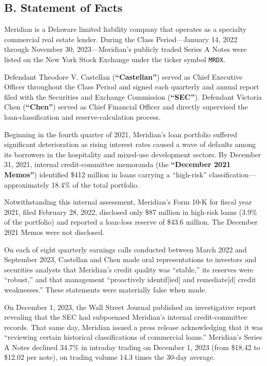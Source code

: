 \documentclass[12pt,letterpaper]{article}
\newcommand{\dterm}[1]{\textbf{``#1''}}
\begin{document}
\subsection*{B. Statement of Facts}

\begin{factlist}

\item Meridian is a Delaware limited liability company that operates as a specialty commercial real estate lender. During the Class Period---January 14, 2022 through November 30, 2023---Meridian's publicly traded Series A Notes were listed on the New York Stock Exchange under the ticker symbol \texttt{MRDX}.

\item Defendant Theodore V. Castellan (\dterm{Castellan}) served as Chief Executive Officer throughout the Class Period and signed each quarterly and annual report filed with the Securities and Exchange Commission (\dterm{SEC}). Defendant Victoria Chen (\dterm{Chen}) served as Chief Financial Officer and directly supervised the loan-classification and reserve-calculation process.

\item Beginning in the fourth quarter of 2021, Meridian's loan portfolio suffered significant deterioration as rising interest rates caused a wave of defaults among its borrowers in the hospitality and mixed-use development sectors. By December 31, 2021, internal credit-committee memoranda (the \dterm{December 2021 Memos}) identified \$412 million in loans carrying a ``high-risk'' classification---approximately 18.4\% of the total portfolio.

\item Notwithstanding this internal assessment, Meridian's Form 10-K for fiscal year 2021, filed February 28, 2022, disclosed only \$87 million in high-risk loans (3.9\% of the portfolio) and reported a loan-loss reserve of \$43.6 million. The December 2021 Memos were not disclosed.

\item On each of eight quarterly earnings calls conducted between March 2022 and September 2023, Castellan and Chen made oral representations to investors and securities analysts that Meridian's credit quality was ``stable,'' its reserves were ``robust,'' and that management ``proactively identif[ied] and remediate[d] credit weaknesses.'' These statements were materially false when made.

\item On December 1, 2023, the Wall Street Journal published an investigative report revealing that the SEC had subpoenaed Meridian's internal credit-committee records. That same day, Meridian issued a press release acknowledging that it was ``reviewing certain historical classifications of commercial loans.'' Meridian's Series A Notes declined 34.7\% in intraday trading on December 1, 2023 (from \$18.42 to \$12.02 per note), on trading volume 14.3 times the 30-day average.


\end{factlist}
\end{document}
